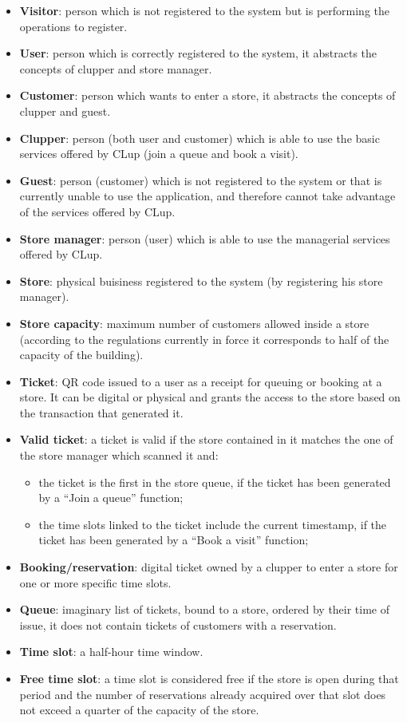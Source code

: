 \begin{itemize}
\item
  \textbf{Visitor}: person which is not registered to the system but is performing the operations to register.
\item
  \textbf{User}: person which is correctly registered to the system, it abstracts the concepts of clupper and store manager.
\item
  \textbf{Customer}: person which wants to enter a store, it abstracts the concepts of clupper and guest.
\item
  \textbf{Clupper}: person (both user and customer) which is able to use the basic services offered by CLup (join a queue and book a visit).
\item
  \textbf{Guest}: person (customer) which is not registered to the system or that is currently unable to use the application, and therefore cannot take advantage of the services offered by CLup.
\item
  \textbf{Store manager}: person (user) which is able to use the managerial services offered by CLup.
\item
  \textbf{Store}: physical buisiness registered to the system (by registering his store manager).
\item
  \textbf{Store capacity}: maximum number of customers allowed inside a store (according to the regulations currently in force it corresponds to half of the capacity of the building).
\item
  \textbf{Ticket}: QR code issued to a user as a receipt for queuing or booking at a store. It can be digital or physical and grants the access to the store based on the transaction that generated it.
  
\item
  \textbf{Valid ticket}: a ticket is valid if the store contained in it matches the one of the store manager which scanned it and:
  \begin{itemize}
  \tightlist
  \item
    the ticket is the first in the store queue, if the ticket has been generated by a ``Join a queue'' function;
  \item
    the time slots linked to the ticket include the current timestamp, if the ticket has been generated by a ``Book a visit'' function;
  \end{itemize}
\item
  \textbf{Booking/reservation}: digital ticket owned by a clupper to enter a store for one or more specific time slots.
\item
  \textbf{Queue}: imaginary list of tickets, bound to a store, ordered by their time of issue, it does not contain tickets of customers with a reservation.
\item
  \textbf{Time slot}: a half-hour time window.
\item
  \textbf{Free time slot}: a time slot is considered free if the store is open during that period and the number of reservations already acquired over that slot does not exceed a quarter of the capacity of the store.
\end{itemize}

